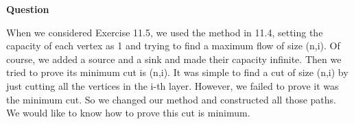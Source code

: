 \documentclass{article} %
\begin{document}
 \textbf{Question}\par
  	When we considered Exercise 11.5, we used the method in 11.4, setting the capacity of each vertex as 1 and trying to find a maximum flow of size (n,i). Of course, we added a source and a sink and made their capacity infinite. Then we tried to prove its minimum cut is (n,i). It was simple to find a cut of size (n,i) by just cutting all the vertices in the i-th layer. However, we failed to prove it was the minimum cut. So we changed our method and constructed all those paths. We would like to know how to prove this cut is minimum.
\end{document}
